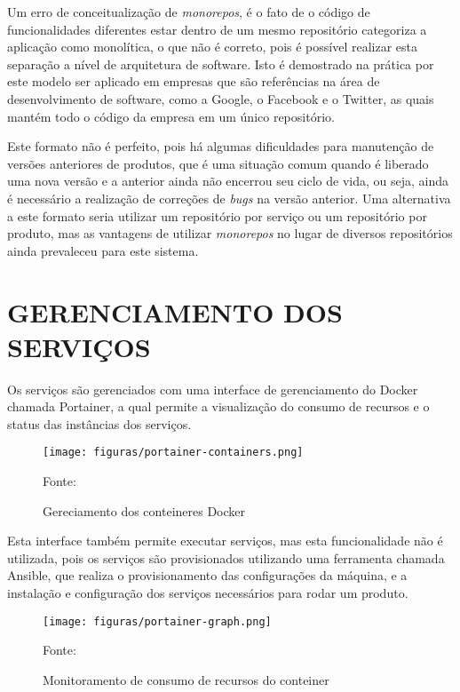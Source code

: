 Um erro de conceitualização de \emph{monorepos}, é o fato de o código de
funcionalidades diferentes estar dentro de um mesmo repositório categoriza
a aplicação como monolítica, o que não é correto, pois é possível
realizar esta separação a nível de arquitetura de software. Isto é demostrado
na prática por este modelo ser aplicado em empresas que são referências
na área de desenvolvimento de software, como a Google, o Facebook e o Twitter,
as quais mantém todo o código da empresa em um único repositório.

Este formato não é perfeito, pois há algumas dificuldades para manutenção
de versões anteriores de produtos, que é uma situação comum quando é
liberado uma nova versão e a anterior ainda não encerrou seu ciclo de vida,
ou seja, ainda é necessário a realização de correções de \emph{bugs}
na versão anterior. Uma alternativa a este formato seria utilizar um
repositório por serviço ou um repositório por produto, mas as vantagens
de utilizar \emph{monorepos} no lugar de diversos repositórios ainda
prevaleceu para este sistema.

\section{GERENCIAMENTO DOS SERVIÇOS}

Os serviços são gerenciados com uma interface de gerenciamento do Docker chamada
Portainer, a qual permite a visualização do consumo de recursos e o status das
instâncias dos serviços.

\begin{figure}[H]
	\centering
	\caption{Gereciamento dos conteineres Docker}
	\texttt{[image: figuras/portainer-containers.png]}

	\label{fig:portainer-containers}
	\footnotesize Fonte: \fonteOAutor
\end{figure}

Esta interface também permite executar serviços, mas esta funcionalidade não é
utilizada, pois os serviços são provisionados utilizando uma ferramenta chamada
Ansible, que realiza o provisionamento das configurações da máquina, e a
instalação e configuração dos serviços necessários para rodar um produto.

\begin{figure}[H]
	\centering
	\caption{Monitoramento de consumo de recursos do conteiner}
	\texttt{[image: figuras/portainer-graph.png]}

	\label{fig:portainer-graph}
	\footnotesize Fonte: \fonteOAutor
\end{figure}

